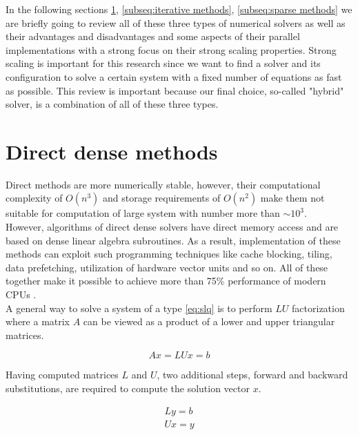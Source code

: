 In the following sections \ref{subseq:direct methods}, \ref{subseq:iterative methods}, \ref{subseq:sparse methods} we are briefly going to review all of these three types of numerical solvers as well as their advantages and disadvantages and some aspects of their parallel implementations with a strong focus on their strong scaling properties. Strong scaling is important for this research since we want to find a solver and its configuration to solve a certain system with a fixed number of equations as fast as possible. This review is important because our final choice, so-called "hybrid" solver, is a combination of all of these three types. 



\section{Direct dense methods} \label{subseq:direct methods}
Direct methods are more numerically stable, however, their computational complexity of $O(n^3)$ and storage requirements of $O(n^2)$ make them not suitable for computation of large system with number more than $\sim 10^3$. \\


However, algorithms of direct dense solvers have direct memory access and are based on dense linear algebra subroutines. As a result, implementation of these methods can exploit such programming techniques like cache blocking, tiling, data prefetching,  utilization of hardware vector units and so on. All of these together make it possible to achieve more than 75\% performance of modern CPUs \cite{articles:blas-performance}. \\

A general way to solve a system of a type \ref{eq:slq} is to perform $LU$ factorization where a matrix $A$ can be viewed as a product of a lower and upper triangular matrices. 

\begin{equation} \label{eq:lu}
	Ax = LUx = b
\end{equation}

Having computed matrices $L$ and $U$, two additional steps, forward and backward substitutions, are required to compute the solution vector $x$.

\begin{align} \label{eq:bk}
	Ly = b \\
	Ux = y
\end{align}

